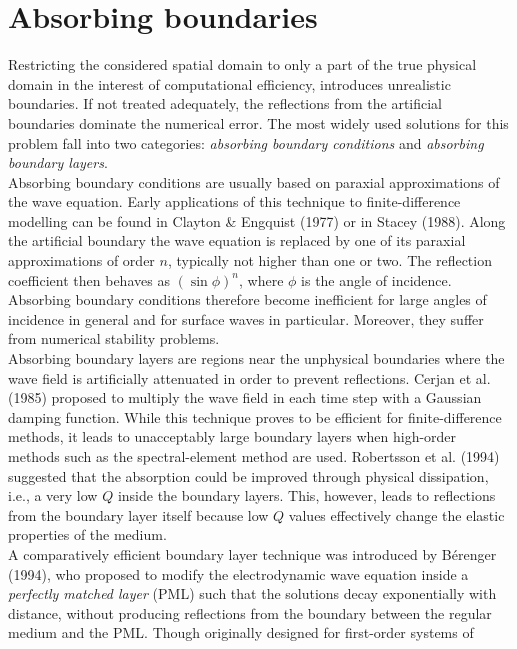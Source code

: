 
\chapter{Absorbing boundaries}\label{S:absbound_theo}

Restricting the considered spatial domain to only a part of the true physical
domain in the interest of computational efficiency, introduces
unrealistic boundaries. If not treated adequately, the reflections
from the artificial boundaries dominate the numerical error. The
most widely used solutions for this problem fall into two
categories: \emph{absorbing boundary conditions} and \emph{absorbing
boundary layers}.\\
Absorbing boundary conditions are usually based on paraxial
approximations of the wave equation. Early applications of this
technique to finite-difference modelling can be found in Clayton \&
Engquist (1977) or in Stacey (1988). Along the artificial boundary the wave
equation is replaced by one of its paraxial approximations of order
$n$, typically not higher than one or two. The reflection
coefficient then behaves as $(\sin \phi)^n$, where $\phi$ is the
angle of incidence. Absorbing boundary conditions therefore become
inefficient for large angles of incidence in general and for surface
waves in particular. Moreover, they suffer from numerical stability
problems.\\
Absorbing boundary layers are regions near the unphysical boundaries
where the wave field is artificially attenuated in order to prevent
reflections. Cerjan et al. (1985) proposed to multiply the wave
field in each time step with a Gaussian damping function. While this
technique proves to be efficient for finite-difference methods, it
leads to unacceptably large boundary layers when high-order methods
such as the spectral-element method are used. Robertsson et al.
(1994) suggested that the absorption could be improved through
physical dissipation, i.e., a very low $Q$ inside the boundary
layers. This, however, leads to reflections from the boundary layer
itself because low $Q$ values effectively change the elastic
properties of the medium.\\
A comparatively efficient boundary layer technique was introduced by
B\'{e}renger (1994), who proposed to modify the electrodynamic wave
equation inside a \emph{perfectly matched layer} (PML) such that the
solutions decay exponentially with distance, without producing
reflections from the boundary between the regular medium and the
PML. Though originally designed for first-order systems of
